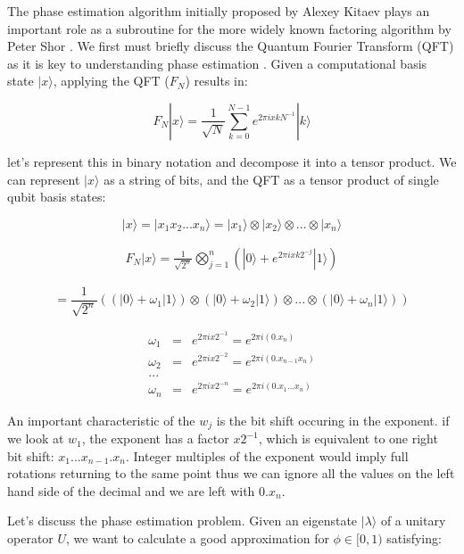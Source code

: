 \documentclass[twocolumn,showpacs,preprintnumbers,amsmath,amssymb]{revtex4}
\begin{document}
		The phase estimation algorithm initially proposed by Alexey Kitaev \cite{kitaev1995quantum} plays an important role as a subroutine for the more widely known factoring algorithm by Peter Shor \cite{Shor}. We first must briefly discuss the Quantum Fourier Transform (QFT) as it is key to understanding phase estimation \cite{nielsen00}. Given a computational basis state $|x\rangle$, applying the QFT ($F_N$) results in:
		
		$$ F_N |x \rangle = \frac{1}{\sqrt{N}} \sum_{k=0}^{N-1} e^{2\pi i x k N^{-1}} |k\rangle $$
		
		let's represent this in binary notation and decompose it into a tensor product. We can represent $|x\rangle$ as a string of bits, and the QFT as a tensor product of single qubit basis states:
				
		$$|x\rangle = |x_1x_2 ... x_n\rangle =  |x_1\rangle \otimes |x_2\rangle \otimes ... \otimes |x_n\rangle$$
		
		\begin{eqnarray}
		F_N |x \rangle = \frac{1}{\sqrt{2^n}} \bigotimes_{j=1}^n (|0\rangle +  e^{2\pi i x k 2^{-j}} |1\rangle)
		\end{eqnarray}
		
		$$= \frac{1}{\sqrt{2^n}} ((|0\rangle + \omega_1|1\rangle)  \otimes(|0\rangle + \omega_2|1\rangle)\otimes ... \otimes(|0\rangle + \omega_n|1\rangle))$$
	    
	     
		\begin{eqnarray*}
		\omega_1 &=& e^{2\pi i x 2^{-1}} =  e^{2\pi i (0.x_n)}\\
		\omega_2 &=& e^{2\pi i x 2^{-2}} =  e^{2\pi i (0.x_{n-1}x_n)}\\
		...\\
		\omega_n &=& e^{2\pi i x 2^{-n}} =  e^{2\pi i (0.x_1...x_n)}
		\end{eqnarray*}
	    
		
		An important characteristic of the $w_j$ is the bit shift occuring in the exponent. if we look at $w_1$, the exponent has a factor $x 2^{-1}$, which is equivalent to one right bit shift: $x_1...x_{n-1}.x_n$. Integer multiples of the exponent would imply full rotations returning to the same point thus we can ignore all the values on the left hand side of the decimal and we are left with $0.x_n$. 
		
		
	    
		Let's discuss the phase estimation problem. Given an eigenstate $|\lambda \rangle$ of a unitary operator $U$, we want to calculate a good approximation  for $\phi \in [0,1)$ satisfying:
		
\end{document}
